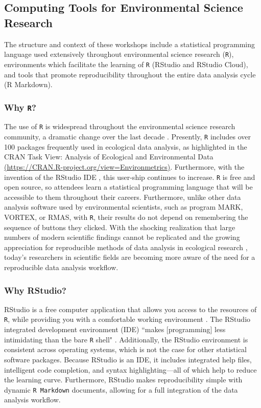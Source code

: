 \documentclass[12pt]{article}
\begin{document}
\subsection{Computing Tools for Environmental Science Research}  

\quad The structure and context of these workshops include a statistical
programming language used extensively throughout environmental science research
(\texttt{R}), environments which facilitate the learning of \texttt{R}
(RStudio and RStudio Cloud), and tools that promote reproducibility throughout
the entire data analysis cycle (R Markdown).

\subsubsection{Why \texttt{R}?} 

\quad The use of \texttt{R} is widespread throughout the environmental science
research community, a dramatic change over the last decade \citep{Rpopular}. 
Presently, \texttt{R} includes over 100 packages frequently used in ecological
data analysis, as highlighted in the CRAN Task View: Analysis of Ecological and
Environmental Data \href{https://CRAN.R-project.org/view=Environmetrics}{(https://CRAN.R-project.org/view=Environmetrics)}. Furthermore, with the invention of the RStudio IDE 
\citep{rstudio}, this user-ship continues to increase. \texttt{R} is free and
open source, so attendees learn a statistical programming language that will be
accessible to them throughout their careers. Furthermore, unlike other data
analysis software used by environmental scientists, such as program MARK,
VORTEX, or RMAS, with \texttt{R}, their results do not depend on remembering the
sequence of buttons they clicked. With the shocking realization that large 
numbers of modern scientific findings cannot be replicated \citep{economist, 
johnson} and the growing appreciation for reproducible methods of data analysis
in ecological research \citep{reproducibilty-comment, repeatability, pva,
reproducibility_ecology}, today's researchers in scientific fields are becoming 
more aware of the need for a reproducible data analysis workflow. 

\subsubsection{Why RStudio?}

\quad RStudio is a free computer application that allows you access to the 
resources of \texttt{R}, while providing you with a comfortable working
environment \citep{rstudio}. The RStudio integrated development environment 
(IDE) ``makes [programming] less intimidating than the bare \texttt{R} shell" 
\citep[p. 59]{mine}. Additionally, the RStudio environment is consistent across
operating systems, which is not the case for other statistical software
packages. Because RStudio is an IDE, it includes integrated help files,
intelligent code completion, and syntax highlighting---all of which help to
reduce the learning curve. Furthermore, RStudio makes reproducibility simple
with dynamic \texttt{R Markdown} documents, allowing for a full integration of
the data analysis workflow.
\end{document}
